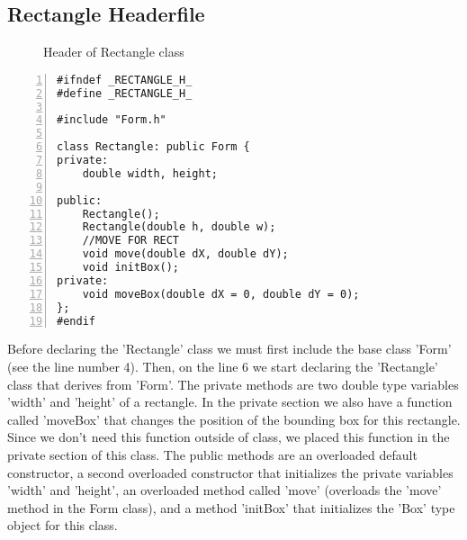 \documentclass{article}
\begin{document}
\subsection{Rectangle Headerfile}
\begin{figure}
\scriptsize{\caption{Header of Rectangle class}}
\end{figure}
\begin{lstlisting}[basicstyle=\footnotesize\ttfamily, numbers=left, stepnumber=1, numberstyle = \normalsize]
#ifndef _RECTANGLE_H_
#define _RECTANGLE_H_

#include "Form.h"

class Rectangle: public Form {
private:
	double width, height;

public:
	Rectangle();
	Rectangle(double h, double w);
	//MOVE FOR RECT
	void move(double dX, double dY);
	void initBox();
private:
	void moveBox(double dX = 0, double dY = 0);
};
#endif
\end{lstlisting}
\normalsize{Before declaring the 'Rectangle' class we must first include the base class 'Form' (see the line number 4). Then, on the line 6 we start declaring the 'Rectangle' class that derives from 'Form'.
The private methods are two double type variables 'width' and 'height' of a rectangle. In the private section we also have a function called 'moveBox' that changes the position of the bounding box for this rectangle. Since we don't need this function outside of class, we placed this function in the private section of this class.
The public methods are an overloaded default constructor, a second overloaded constructor that initializes the private variables 'width' and 'height', an overloaded method called 'move' (overloads the 'move' method in the Form class), and a method 'initBox' that initializes the 'Box' type object for this class.

}\newpage
\end{document}
